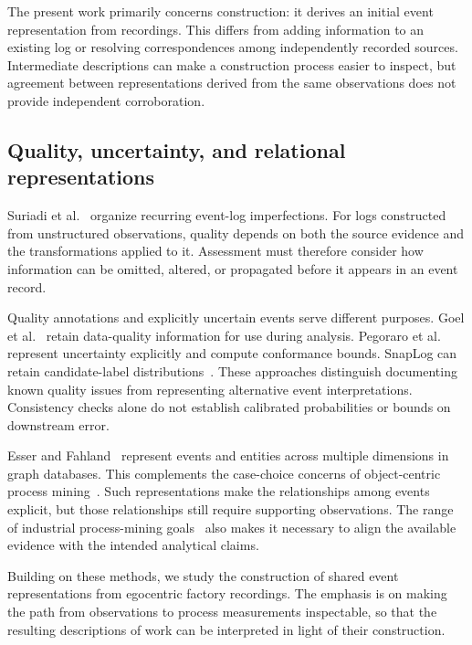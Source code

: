 The present work primarily concerns construction: it derives an initial event representation from recordings. This differs from adding information to an existing log or resolving correspondences among independently recorded sources. Intermediate descriptions can make a construction process easier to inspect, but agreement between representations derived from the same observations does not provide independent corroboration.

\subsection{Quality, uncertainty, and relational representations}
Suriadi et al.~\cite{suriadi2017imperfections} organize recurring event-log imperfections. For logs constructed from unstructured observations, quality depends on both the source evidence and the transformations applied to it. Assessment must therefore consider how information can be omitted, altered, or propagated before it appears in an event record.

Quality annotations and explicitly uncertain events serve different purposes. Goel et al.~\cite{goel2022quality} retain data-quality information for use during analysis. Pegoraro et al.~\cite{pegoraro2021uncertain} represent uncertainty explicitly and compute conformance bounds. SnapLog can retain candidate-label distributions~\cite{pegoraro2026snaplog}. These approaches distinguish documenting known quality issues from representing alternative event interpretations. Consistency checks alone do not establish calibrated probabilities or bounds on downstream error.

Esser and Fahland~\cite{esser2021multidimensional} represent events and entities across multiple dimensions in graph databases. This complements the case-choice concerns of object-centric process mining~\cite{aalst2019objectcentric}. Such representations make the relationships among events explicit, but those relationships still require supporting observations. The range of industrial process-mining goals~\cite{corallo2020industrial} also makes it necessary to align the available evidence with the intended analytical claims.

Building on these methods, we study the construction of shared event representations from egocentric factory recordings. The emphasis is on making the path from observations to process measurements inspectable, so that the resulting descriptions of work can be interpreted in light of their construction.
